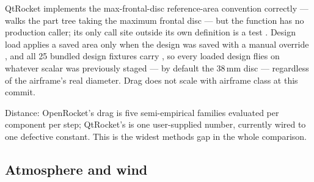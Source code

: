 \begin{hardfail}
QtRocket implements the max-frontal-disc reference-area convention correctly ---
  walks the part tree
taking the maximum frontal disc  --- but the function has no
production caller; its only call site outside its own definition is a test
. Design load applies a saved area only when the design
was saved with a manual override , and all 25 bundled
design fixtures carry , so every loaded design flies
on whatever scalar was previously staged --- by default the 38\,mm disc --- regardless of the
airframe's real diameter. Drag does not scale with airframe class at this commit. \fail
\end{hardfail}

Distance: OpenRocket's drag is five semi-empirical families evaluated per component per
step; QtRocket's is one user-supplied number, currently wired to one defective constant.
This is the widest methods gap in the whole comparison.

\subsection{Atmosphere and wind}\label{app:or-methods-atmosphere}

